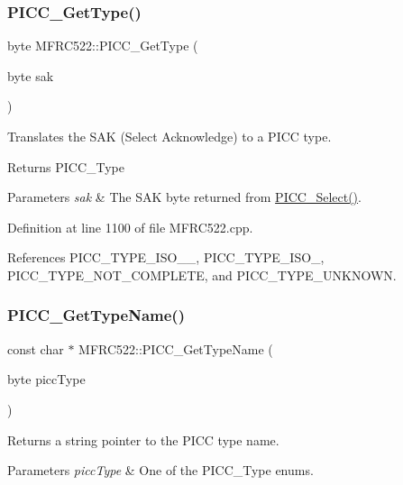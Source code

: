 \subsubsection{\texorpdfstring{P\+I\+C\+C\+\_\+\+Get\+Type()}{PICC\_GetType()}}
{\footnotesize\ttfamily byte M\+F\+R\+C522\+::\+P\+I\+C\+C\+\_\+\+Get\+Type (\begin{DoxyParamCaption}\item[{byte}]{sak }\end{DoxyParamCaption})}

Translates the S\+AK (Select Acknowledge) to a P\+I\+CC type.

\begin{DoxyReturn}{Returns}
P\+I\+C\+C\+\_\+\+Type 
\end{DoxyReturn}

\begin{DoxyParams}{Parameters}
{\em sak} & The S\+AK byte returned from \hyperlink{class_m_f_r_c522_ab40449ac80501db28d25889612bb2db0}{P\+I\+C\+C\+\_\+\+Select()}. \\
\hline
\end{DoxyParams}


Definition at line 1100 of file M\+F\+R\+C522.\+cpp.



References P\+I\+C\+C\+\_\+\+T\+Y\+P\+E\+\_\+\+I\+S\+O\+\_\+\_, P\+I\+C\+C\+\_\+\+T\+Y\+P\+E\+\_\+\+I\+S\+O\+\_, P\+I\+C\+C\+\_\+\+T\+Y\+P\+E\+\_\+\+N\+O\+T\+\_\+\+C\+O\+M\+P\+L\+E\+TE, and P\+I\+C\+C\+\_\+\+T\+Y\+P\+E\+\_\+\+U\+N\+K\+N\+O\+WN.

\mbox{\label{class_m_f_r_c522_aca99128b3a8a192473d0b715a48b9f97}} 
\subsubsection{\texorpdfstring{P\+I\+C\+C\+\_\+\+Get\+Type\+Name()}{PICC\_GetTypeName()}}
{\footnotesize\ttfamily const char $\ast$ M\+F\+R\+C522\+::\+P\+I\+C\+C\+\_\+\+Get\+Type\+Name (\begin{DoxyParamCaption}\item[{byte}]{picc\+Type }\end{DoxyParamCaption})}

Returns a string pointer to the P\+I\+CC type name. 
\begin{DoxyParams}{Parameters}
{\em picc\+Type} & One of the P\+I\+C\+C\+\_\+\+Type enums. \\
\hline
\end{DoxyParams}


